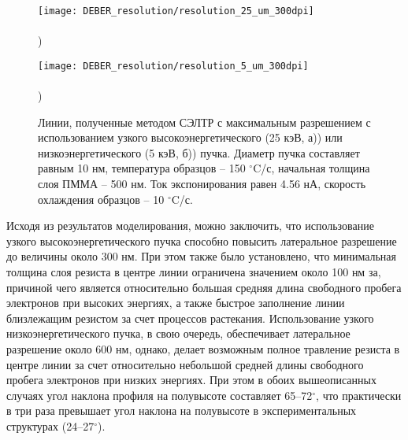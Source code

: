 \begin{figure}[t]
	\begin{minipage}{0.48\textwidth}
		\texttt{[image: DEBER\_resolution/resolution\_25\_um\_300dpi]} \\
		\vspace{-28.7ex} \\ ) \\ \vspace{28.7ex}
	\end{minipage}
	\begin{minipage}{0.48\textwidth}
		\texttt{[image: DEBER\_resolution/resolution\_5\_um\_300dpi]} \\
		\vspace{-28.7ex} \\ ) \\ \vspace{28.7ex}
	\end{minipage}
	\vspace{-3.5em}
	\caption{Линии, полученные методом СЭЛТР с максимальным разрешением с использованием узкого высокоэнергетического (25 кэВ, а)) или низкоэнергетического (5 кэВ, б)) пучка. Диаметр пучка составляет равным 10 нм, температура образцов -- 150 $^\circ$C/с, начальная толщина слоя ПММА -- 500 нм. Ток экспонирования равен 4.56 нА, скорость охлаждения образцов -- 10 $^\circ$C/с.}
	\label{fig:DEBER_resolution}
\end{figure}

Исходя из результатов моделирования, можно заключить, что использование узкого высокоэнергетического пучка способно повысить латеральное разрешение до величины около 300 нм. При этом также было установлено, что минимальная толщина слоя резиста в центре линии ограничена значением около 100 нм за, причиной чего является относительно большая средняя длина свободного пробега электронов при высоких энергиях, а также быстрое заполнение линии близлежащим резистом за счет процессов растекания. Использование узкого низкоэнергетического пучка, в свою очередь, обеспечивает латеральное разрешение около 600 нм, однако, делает возможным полное травление резиста в центре линии за счет относительно небольшой средней длины свободного пробега электронов при низких энергиях. При этом в обоих вышеописанных случаях угол наклона профиля на полувысоте составляет 65--72$^\circ$, что практически в три раза превышает угол наклона на полувысоте в экспериментальных структурах (24--27$^\circ$).

